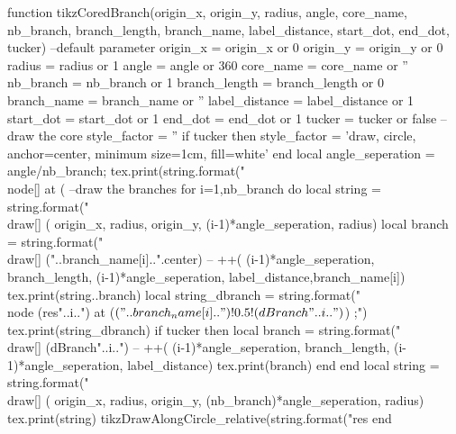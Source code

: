 \begin{luacode*}
	function tikzCoredBranch(origin_x, origin_y, radius, angle, core_name, nb_branch, branch_length, branch_name, label_distance, start_dot, end_dot, tucker)
		--default parameter
		origin_x = origin_x or 0
		origin_y = origin_y or 0
		radius = radius or 1
		angle = angle or 360
		core_name = core_name or ''
		nb_branch = nb_branch or 1
		branch_length = branch_length or 0
		branch_name = branch_name or ''
		label_distance = label_distance or 1
		start_dot = start_dot or 1
		end_dot = end_dot or 1
		tucker = tucker or false
		--draw the core
		style_factor = ''
		if tucker then
		  style_factor = 'draw, circle, anchor=center, minimum size=1cm, fill=white'
		end
		local angle_seperation = angle/nb_branch;
		tex.print(string.format("\\node[] at (%
		--draw the branches
		for i=1,nb_branch do
			local string = string.format("\\draw[] (%
			origin_x, radius, origin_y, (i-1)*angle_seperation, radius)
			local branch = string.format("\\draw[] ("..branch_name[i]..".center) -- ++(%
			(i-1)*angle_seperation, branch_length, (i-1)*angle_seperation, label_distance,branch_name[i])
			tex.print(string..branch)
			local string_dbranch = string.format("\\node (res"..i..") at ($("..branch_name[i]..")!0.5!(dBranch"..i..")$) {};")
			tex.print(string_dbranch)
			if tucker then
			  local branch = string.format("\\draw[] (dBranch"..i..") -- ++(%
			  (i-1)*angle_seperation, branch_length, (i-1)*angle_seperation, label_distance)
			  tex.print(branch)
			end
		end
		local string = string.format("\\draw[] (%
		origin_x, radius, origin_y, (nb_branch)*angle_seperation, radius)
		tex.print(string)
		tikzDrawAlongCircle_relative(string.format("res%
	end
  

\end{luacode*}
